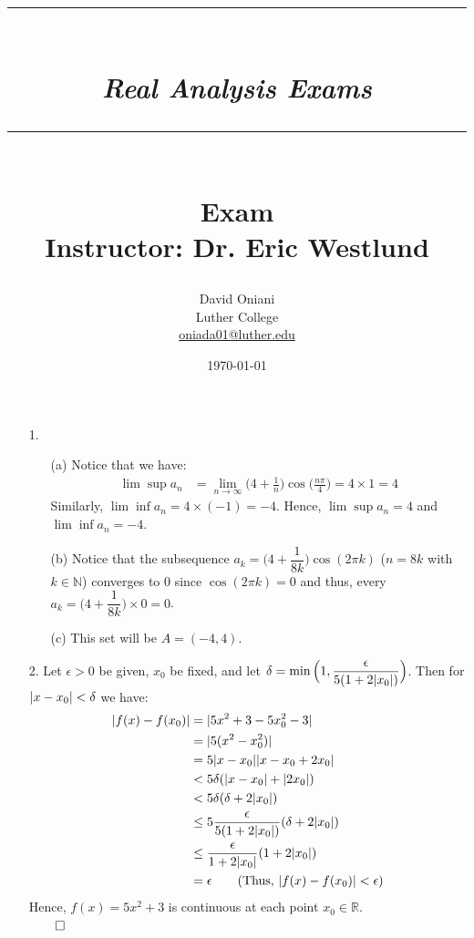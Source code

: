 \documentclass[11pt]{article}
\author{David Oniani\\
        Luther College\\
        \href{mailto:oniada01@luther.edu}{oniada01@luther.edu}}
\title{\rule{\paperwidth - 150pt}{1pt}\textbf{\\\textit{Real Analysis
Exams}\\}\rule {\paperwidth - 150pt}{1pt}\\\textbf{Exam
\textnumero4}\\{\normalsize Instructor: Dr. Eric Westlund}}
\date{\today}
\DeclarePairedDelimiter\abs{\lvert}{\rvert}%
\newcommand{\nats}{\mathbb{N}}
\newcommand{\reals}{\mathbb{R}}
\begin{document}
\maketitle


\begin{itemize}
    \item[1.]
        \begin{itemize}
            \item[(a)]
                Notice that we have:
                \begin{align*}
                    \lim \sup a_n &= \lim_{n \to \infty} \Big(4 +
                                        \frac{1}{n}\Big) \cos
                                            \Big(\frac{n\pi}{4}\Big)
                                                = 4 \times 1 = 4
                \end{align*}
                Similarly, $\lim \inf a_n = 4 \times (-1) = -4$. Hence, $\lim
                \sup a_n = 4$ and $\lim \inf a_n = -4$.

            \item[(b)]
                Notice that the subsequence $a_k = \Big(4 +
                \dfrac{1}{8k}\Big)\cos (2\pi k)$ ($n = 8k$ with $k \in \nats$)
                converges to $0$ since $\cos (2\pi k) = 0$ and thus, every $a_k
                = \Big(4 + \dfrac{1}{8k}\Big) \times 0 = 0$.

            \item[(c)]
                This set will be $A = (-4, 4)$.
        \end{itemize}

    \clearpage

    \item[2.]
        Let $\epsilon > 0$ be given, $x_0$ be fixed, and let $\delta = \min
        \Big(1, \dfrac{\epsilon}{5(1 + 2\abs{x_0})}\Big)$. Then for $\abs{x -
        x_0} < \delta$ we have:
        \begin{align*}
            \abs{f(x) - f(x_0)} &= \abs{5x^2 + 3 - 5x_0^2 - 3}\\
                                &= \abs{5 (x^2 - x_0^2)}\\
                                &= 5 \abs{x - x_0} \abs{x - x_0 + 2x_0}\\
                                &< 5 \delta (\abs{x - x_0} + \abs{2x_0})\\
                                &< 5 \delta (\delta + 2\abs{x_0})\\
                                &\leq 5 \frac{\epsilon}{5(1 + 2\abs{x_0})} (\delta + 2\abs{x_0})\\
                                &\leq \frac{\epsilon}{1 + 2\abs{x_0}} (1 + 2\abs{x_0})\\
                                &= \epsilon
                                \tag{Thus, $\abs{f(x) - f(x_0)} < \epsilon$}
        \end{align*}
        Hence, $f(x) = 5x^2 + 3$ is continuous at each point $x_0 \in
        \reals$.\\
        $\qed$


\end{itemize}
\end{document}
